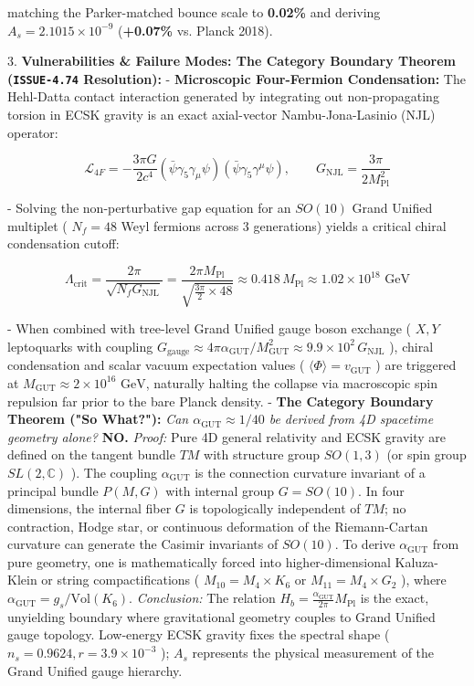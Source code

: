 \documentclass[11pt,a4paper]{article}
\theoremstyle{definition}
\theoremstyle{remark}
\begin{document}
matching the Parker-matched bounce scale to \textbf{0.02\%} and deriving $A_s = 2.1015 \times 10^{-9}$ (\textbf{+0.07\%} vs. Planck 2018).

3. \textbf{Vulnerabilities \& Failure Modes: The Category Boundary Theorem (\texttt{ISSUE-4.74} Resolution):}
- \textbf{Microscopic Four-Fermion Condensation:} The Hehl-Datta contact interaction generated by integrating out non-propagating torsion in ECSK gravity is an exact axial-vector Nambu-Jona-Lasinio (NJL) operator:


\begin{equation}
\mathcal{L}_{4F} = -\frac{3\pi G}{2 c^4} (\bar{\psi} \gamma_5 \gamma_\mu \psi)(\bar{\psi} \gamma_5 \gamma^\mu \psi), \qquad G_{\text{NJL}} = \frac{3\pi}{2 M_{\text{Pl}}^2}
\end{equation}


- Solving the non-perturbative gap equation for an $SO(10)$ Grand Unified multiplet ( $N_f = 48$ Weyl fermions across 3 generations) yields a critical chiral condensation cutoff:


\begin{equation}
\Lambda_{\text{crit}} = \frac{2\pi}{\sqrt{N_f G_{\text{NJL}}}} = \frac{2\pi M_{\text{Pl}}}{\sqrt{\frac{3\pi}{2} \times 48}} \approx 0.418 \, M_{\text{Pl}} \approx 1.02 \times 10^{18} \text{ GeV}
\end{equation}


- When combined with tree-level Grand Unified gauge boson exchange ( $X, Y$ leptoquarks with coupling $G_{\text{gauge}} \approx 4\pi \alpha_{\text{GUT}} / M_{\text{GUT}}^2 \approx 9.9 \times 10^2 \, G_{\text{NJL}}$ ), chiral condensation and scalar vacuum expectation values ( $\langle \Phi \rangle = v_{\text{GUT}}$ ) are triggered at $M_{\text{GUT}} \approx 2 \times 10^{16}\text{ GeV}$, naturally halting the collapse via macroscopic spin repulsion far prior to the bare Planck density.
- \textbf{The Category Boundary Theorem ("So What?"):}
\textit{Can $\alpha_{\text{GUT}} \approx 1/40$ be derived from 4D spacetime geometry alone?} \textbf{NO.}
\textit{Proof:} Pure 4D general relativity and ECSK gravity are defined on the tangent bundle $TM$ with structure group $SO(1,3)$ (or spin group $SL(2,\mathbb{C})$ ). The coupling $\alpha_{\text{GUT}}$ is the connection curvature invariant of a principal bundle $P(M, G)$ with internal group $G = SO(10)$. In four dimensions, the internal fiber $G$ is topologically independent of $TM$; no contraction, Hodge star, or continuous deformation of the Riemann-Cartan curvature can generate the Casimir invariants of $SO(10)$.
To derive $\alpha_{\text{GUT}}$ from pure geometry, one is mathematically forced into higher-dimensional Kaluza-Klein or string compactifications ( $M_{10} = M_4 \times K_6$ or $M_{11} = M_4 \times G_2$ ), where $\alpha_{\text{GUT}} = g_s / \mathrm{Vol}(K_6)$.
\textit{Conclusion:} The relation $H_b = \frac{\alpha_{\text{GUT}}}{2\pi} M_{\text{Pl}}$ is the exact, unyielding boundary where gravitational geometry couples to Grand Unified gauge topology. Low-energy ECSK gravity fixes the spectral shape ( $n_s = 0.9624, r = 3.9 \times 10^{-3}$ ); $A_s$ represents the physical measurement of the Grand Unified gauge hierarchy.
\end{document}
